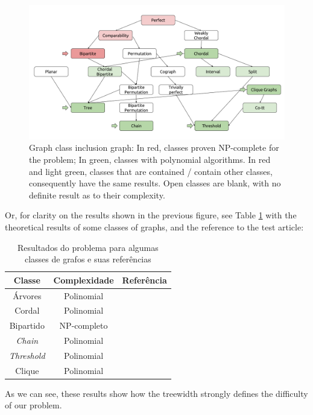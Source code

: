 \begin{figure}
  \includegraphics[width=18cm,center]{img/Figure2-1.png}
  \caption{
  Graph class inclusion graph: In red, classes proven NP-complete for the problem; In green, classes with polynomial algorithms. In red and light green, classes that are contained / contain other classes, consequently have the same results. Open classes are blank, with no definite result as to their complexity.}
  \label{fig:graph2}
\end{figure}

Or, for clarity on the results shown in the previous figure, see Table \ref{tab:2} with the theoretical results of some classes of graphs, and the reference to the test article:
\begin{table}[!htbp]
\caption{Resultados do problema para algumas classes de grafos e suas referências} \label{tab:2}
\begin{center}
 \begin{tabular}{||c c c||} 
 \hline
 Classe & Complexidade & Referência \\ [0.5ex] 
 \hline\hline
 Árvores & Polinomial & \cite{centeno2011} \\ 
 \hline
 Cordal & Polinomial & \cite{centeno2011} \\ 
 \hline
 Bipartido & NP-completo & \cite{Reddy2010} \\
 \hline
 \textit{Chain} & Polinomial &  \cite{Reddy2010}  \\
 \hline
 \textit{Threshold} & Polinomial & \cite{chen2009}\\
 \hline
 Clique & Polinomial & \cite{Nichterlein2013} \\
 \hline
\end{tabular}
\end{center}
\end{table}

As we can see, these results show how the treewidth strongly defines the difficulty of our problem.  


